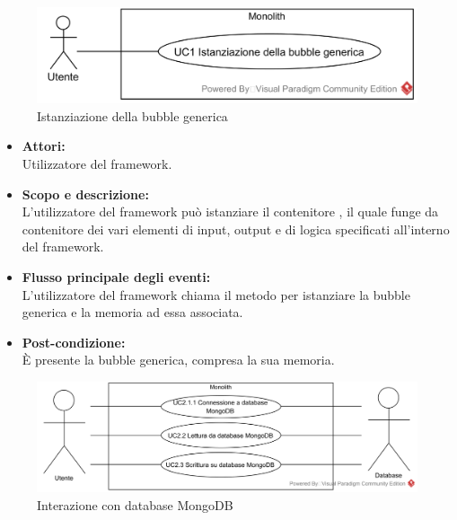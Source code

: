 
\begin{figure}[H]
	\centering
	\includegraphics[width=15cm]{../../documenti/AnalisiDeiRequisiti/Diagrammi_img/usecase/uc1_35.png}
	\caption{\UCCaption{} Istanziazione della bubble generica}
\end{figure}

\begin{itemize}
	\item \textbf{Attori:}
	\\Utilizzatore del framework.
	\item \textbf{Scopo e descrizione:} 
	\\L'utilizzatore del framework può istanziare il contenitore , il quale funge da contenitore dei vari elementi di input, output e di logica specificati all'interno del framework.
	\item \textbf{Flusso principale degli eventi:}
	\\L'utilizzatore del framework chiama il metodo per istanziare la bubble generica e la memoria ad essa associata.
	\item \textbf{Post-condizione:}
	\\È presente la bubble generica, compresa la sua memoria.
\end{itemize}


\begin{figure}[H]
	\centering
	\includegraphics[width=15cm]{../../documenti/AnalisiDeiRequisiti/Diagrammi_img/usecase/Database.png}
	\caption{\UCCaption{} Interazione con database MongoDB}
\end{figure}

